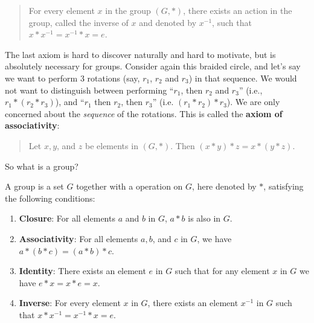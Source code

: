 \newpage

\begin{quote}
    For every element $x$ in the group $(G, \ast)$, there exists an action in the group, called the inverse of $x$ and denoted by $x^{-1}$, such that $x \ast x^{-1} = x^{-1} \ast x = e$.
\end{quote}

\begin{figure}
    \centering
\end{figure}

The last axiom is hard to discover naturally and hard to motivate, but is absolutely necessary for groups. Consider again this braided circle, and let's say we want to perform 3 rotations (say, $r_1$, $r_2$ and $r_3$) in that sequence. We would not want to distinguish between performing ``$r_1$, then $r_2$ and $r_3$'' (i.e., $r_1 \ast (r_2 \ast r_3)$), and ``$r_1$ then $r_2$, then $r_3$'' (i.e. $(r_1 \ast r_2) \ast r_3$). We are only concerned about the \textit{sequence} of the rotations. This is called the \textbf{axiom of associativity}:
\begin{quote}
    Let $x, y$, and $z$ be elements in $(G, \ast)$. Then $(x \ast y) \ast z = x \ast (y \ast z)$.
\end{quote}

So what is a group?
\begin{definition}
    A group is a set $G$ together with a operation on $G$, here denoted by $\ast$, satisfying the following conditions:
    \begin{enumerate}
        \item \textbf{Closure}: For all elements $a$ and $b$ in $G$, $a \ast b$ is also in $G$.
        \item \textbf{Associativity}: For all elements $a, b$, and $c$ in $G$, we have $a \ast (b \ast c) = (a \ast b) \ast c$.
        \item \textbf{Identity}: There exists an element $e$ in $G$ such that for any element $x$ in $G$ we have $e \ast x = x \ast e = x$.
        \item \textbf{Inverse}: For every element $x$ in $G$, there exists an element $x^{-1}$ in $G$ such that $x \ast x^{-1} = x^{-1} \ast x = e$.
    \end{enumerate}
\end{definition}

